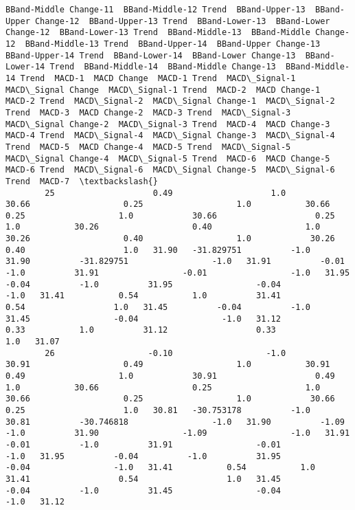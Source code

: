 \documentclass[11pt]{article}
\begin{document}
\begin{Verbatim}[commandchars=\\\{\}]
            BBand-Middle Change-11  BBand-Middle-12 Trend  BBand-Upper-13  BBand-Upper Change-12  BBand-Upper-13 Trend  BBand-Lower-13  BBand-Lower Change-12  BBand-Lower-13 Trend  BBand-Middle-13  BBand-Middle Change-12  BBand-Middle-13 Trend  BBand-Upper-14  BBand-Upper Change-13  BBand-Upper-14 Trend  BBand-Lower-14  BBand-Lower Change-13  BBand-Lower-14 Trend  BBand-Middle-14  BBand-Middle Change-13  BBand-Middle-14 Trend  MACD-1  MACD Change  MACD-1 Trend  MACD\_Signal-1  MACD\_Signal Change  MACD\_Signal-1 Trend  MACD-2  MACD Change-1  MACD-2 Trend  MACD\_Signal-2  MACD\_Signal Change-1  MACD\_Signal-2 Trend  MACD-3  MACD Change-2  MACD-3 Trend  MACD\_Signal-3  MACD\_Signal Change-2  MACD\_Signal-3 Trend  MACD-4  MACD Change-3  MACD-4 Trend  MACD\_Signal-4  MACD\_Signal Change-3  MACD\_Signal-4 Trend  MACD-5  MACD Change-4  MACD-5 Trend  MACD\_Signal-5  MACD\_Signal Change-4  MACD\_Signal-5 Trend  MACD-6  MACD Change-5  MACD-6 Trend  MACD\_Signal-6  MACD\_Signal Change-5  MACD\_Signal-6 Trend  MACD-7  \textbackslash{}
        25                    0.49                    1.0           30.66                   0.25                   1.0           30.66                   0.25                   1.0            30.66                    0.25                    1.0           30.26                   0.40                   1.0           30.26                   0.40                   1.0            30.26                    0.40                    1.0   31.90   -31.829751          -1.0          31.90          -31.829751                 -1.0   31.91          -0.01          -1.0          31.91                 -0.01                 -1.0   31.95          -0.04          -1.0          31.95                 -0.04                 -1.0   31.41           0.54           1.0          31.41                  0.54                  1.0   31.45          -0.04          -1.0          31.45                 -0.04                 -1.0   31.12           0.33           1.0          31.12                  0.33                  1.0   31.07   
        26                   -0.10                   -1.0           30.91                   0.49                   1.0           30.91                   0.49                   1.0            30.91                    0.49                    1.0           30.66                   0.25                   1.0           30.66                   0.25                   1.0            30.66                    0.25                    1.0   30.81   -30.753178          -1.0          30.81          -30.746818                 -1.0   31.90          -1.09          -1.0          31.90                 -1.09                 -1.0   31.91          -0.01          -1.0          31.91                 -0.01                 -1.0   31.95          -0.04          -1.0          31.95                 -0.04                 -1.0   31.41           0.54           1.0          31.41                  0.54                  1.0   31.45          -0.04          -1.0          31.45                 -0.04                 -1.0   31.12   

\end{Verbatim}
\end{document}
